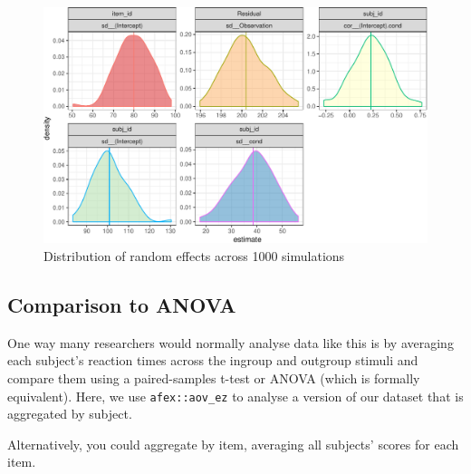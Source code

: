 \documentclass[man,floatsintext]{apa6}
\newenvironment{Shaded}{\begin{snugshade}}{\end{snugshade}}
\newcommand{\KeywordTok}[1]{\textcolor[rgb]{0.13,0.29,0.53}{\textbf{#1}}}
\newcommand{\DataTypeTok}[1]{\textcolor[rgb]{0.13,0.29,0.53}{#1}}
\newcommand{\StringTok}[1]{\textcolor[rgb]{0.31,0.60,0.02}{#1}}
\newcommand{\OperatorTok}[1]{\textcolor[rgb]{0.81,0.36,0.00}{\textbf{#1}}}
\newcommand{\NormalTok}[1]{#1}
\begin{document}
\begin{figure}

{\centering \includegraphics[width=1\linewidth]{images/sim-ranef-plot-1} 

}

\caption{Distribution of random effects across 1000 simulations}\label{fig:sim-ranef-plot}
\end{figure}

\subsection{Comparison to ANOVA}\label{comparison-to-anova}

One way many researchers would normally analyse data like this is by
averaging each subject's reaction times across the ingroup and outgroup
stimuli and compare them using a paired-samples t-test or ANOVA (which
is formally equivalent). Here, we use \texttt{afex::aov\_ez} to analyse
a version of our dataset that is aggregated by subject.

Alternatively, you could aggregate by item, averaging all subjects'
scores for each item.

\begin{Shaded}
\end{Shaded}
\end{document}
